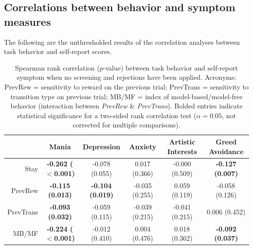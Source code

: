 \documentclass[a4paper,notitlepage,12pt]{article}
\begin{document}
\break
\subsection*{Correlations between behavior and symptom measures}

The following are the unthresholded results of the correlation analyses between task behavior and self-report scores.  

\begin{table}[H]
    \centering
    \begin{adjustbox}{center}   
    \small
    \begin{tabular}{rccccc}
        \toprule
        {} & Mania & Depression & Anxiety & Artistic Interests & Greed Avoidance \\
        \midrule
        Stay      &  \textbf{-0.262 ($<$0.001)} &           -0.078 (0.055) &   0.017 (0.366) &  -0.000 (0.509) &  \textbf{-0.127 (0.007)} \\
        PrevRew   &     \textbf{-0.115 (0.013)} &  \textbf{-0.104 (0.019)} &  -0.035 (0.255) &   0.059 (0.119) &           -0.058 (0.126) \\
        PrevTrans &     \textbf{-0.093 (0.032)} &           -0.059 (0.115) &  -0.039 (0.215) &  -0.041 (0.215) &            0.006 (0.452) \\
        MB/MF     &  \textbf{-0.224 ($<$0.001)} &           -0.012 (0.410) &   0.004 (0.476) &   0.018 (0.362) &  \textbf{-0.092 (0.037)} \\
        \bottomrule
    \end{tabular}
    \end{adjustbox}
    \caption{Spearman rank correlation ($p$-value) between task behavior and self-report symptom when no screening and rejections have been applied. Acronyms: PrevRew = sensitivity to reward on the previous trial; PrevTrans = sensitivity to transition type on previous trial; MB/MF = index of model-based/model-free behavior (interaction between \textit{PrevRew} \& \textit{PrevTrans}). Bolded entries indicate statistical significance for a two-sided rank correlation test ($\alpha = 0.05$, not corrected for multiple comparisons).}
\end{table}
\end{document}
